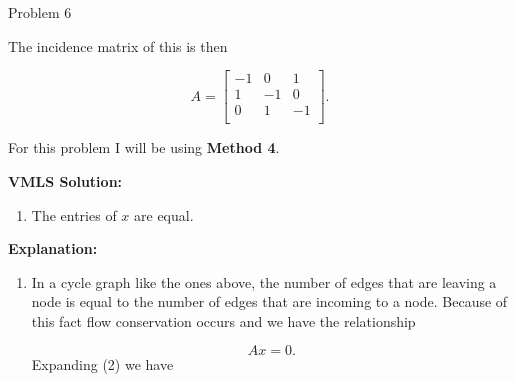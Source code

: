 \begin{problem}{Problem 6}
\begin{highlight}
\begin{enumerate}[label = (\alph*)]
\begin{center}
            \end{center}

            The incidence matrix of this is then

            \setcounter{equation}{0}
            \begin{equation}
                A = 
                \begin{bmatrix}
                    -1 & 0 & 1 \\
                    1 & -1 & 0 \\
                    0 & 1 & -1 \\
                \end{bmatrix}.
            \end{equation}
        \end{enumerate}
    \end{highlight}

    \begin{highlight}
        For this problem I will be using \textbf{Method 4}. \vspace*{1em}

        \noindent \textbf{VMLS Solution:} 

        \begin{enumerate}[label = (\alph*), start = 2]
            \item The entries of $x$ are equal.
        \end{enumerate}

        \noindent \textbf{Explanation:}

        \begin{enumerate}[label = (\alph*), start = 2]
            \item In a cycle graph like the ones above, the number of edges that are leaving a node is equal to the number of edges that are incoming to a node. Because of this fact flow conservation
            occurs and we have the relationship

            \begin{equation}
                Ax = 0.
            \end{equation}
            Expanding (2) we have


\end{enumerate}
\end{highlight}
\end{problem}
